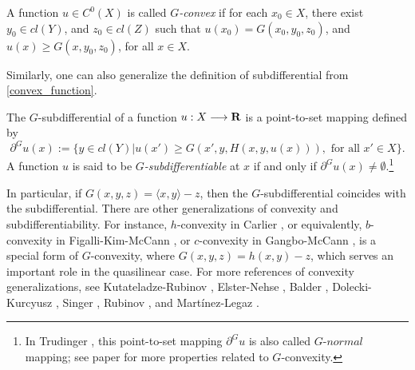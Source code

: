\begin{definition}[$G$-convexity]\label{defn:GConvexity}
 A function $u\in C^0(X)$ is called {\it $G$-convex} if for each $x_0 \in X$, there exist $y_0 \in   cl(Y)$, and $z_0 \in  cl(Z)$ such that $u(x_0)=G(x_0, y_0, z_0)$, and $u(x)\ge G(x, y_0, z_0)$, for all $x\in X$.
\end{definition}
		
		
Similarly, one can also generalize the definition of subdifferential from \eqref{convex_function}.\medskip
		
\begin{definition}[$G$-subdifferentiability]\label{defn:GSubdifferential}
	The $G$-subdifferential of a 
	function $u: X \longrightarrow {\mathbf R}$ is a point-to-set mapping defined by
	\begin{equation*}
			\partial^G u(x):= \{ y\in  cl(Y)| u(x')\ge G(x',y, H(x,y,u(x))), \text{ for all } x'\in X\}.
	\end{equation*}
	A function $u$ is said to be {\it $G$-subdifferentiable} at $x$ if and only if $\partial^G u(x) \neq \emptyset$.\footnote{In Trudinger \cite{Trudinger14}, this point-to-set mapping $\partial^G u$ is also called $G$-$normal$ mapping; see paper for more properties related to $G$-convexity.}		
\end{definition}
			
			
			
			
In particular, if $G(x,y,z) = \langle x, y \rangle - z$, then the $G$-subdifferential coincides with the subdifferential. There are other generalizations of convexity and subdifferentiability. For instance, $h$-convexity in Carlier \cite{Carlier01}, or equivalently, $b$-convexity in Figalli-Kim-McCann \cite{FigalliKimMcCann11}, or $c$-convexity in  Gangbo-McCann \cite{GangboMcCann96}, is a special form of $G$-convexity, where $G(x,y,z)=  h(x,y) -z$, which serves an important role in the quasilinear case. For more references of convexity generalizations, see Kutateladze-Rubinov \cite{KutateladzeRubinov72}, Elster-Nehse \cite{ElsterNehse74}, Balder \cite{Balder77}, Dolecki-Kurcyusz \cite{DoleckiKurcyusz78},  Singer \cite{Singer97},  Rubinov \cite{Rubinov00a}, and Martínez-Legaz \cite{MartinezLegaz05}.\medskip
			
